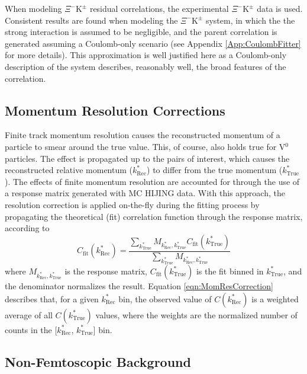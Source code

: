 \documentclass[ALICE,manyauthors]{cernphprep}
\newcommand{\ktrue}{$k^{*}_{\mathrm{True}}$\xspace}
\newcommand{\krec}{$k^{*}_{\mathrm{Rec}}$\xspace}
\newcommand{\XiKpm}{$\Xi^{-}\mathrm{K^{\pm}}$\xspace}
\newcommand{\Vz}{V$^{0}$\xspace}
\begin{document}
When modeling \XiKpm residual correlations, the experimental \XiKpm data is used. 
Consistent results are found when modeling the \XiKpm system, in which the the strong interaction is assumed to be negligible, and the parent correlation is generated assuming a Coulomb-only scenario (see Appendix \ref{App:CoulombFitter} for more details).
This approximation is well justified here as a Coulomb-only description of the system describes, reasonably well, the broad features of the correlation.   


\subsection{Momentum Resolution Corrections}
\label{MomentumResolutionCorrections}

Finite track momentum resolution causes the reconstructed momentum of a particle to smear around the true value.
This, of course, also holds true for \Vz particles.
The effect is propagated up to the pairs of interest, which causes the reconstructed relative momentum (\krec) to differ from the true momentum (\ktrue).
The effects of finite momentum resolution are accounted for through the use of a response matrix generated with MC HIJING data.
With this approach, the resolution correction is applied on-the-fly during the fitting process by propagating the theoretical (fit) correlation function through the response matrix, according to
\begin{equation}
  C_{\mathrm{fit}}(k^{*}_{\mathrm{Rec}}) = \dfrac{\sum\limits_{k^{*}_{\mathrm{True}}}M_{k^{*}_{\mathrm{Rec}},k^{*}_{\mathrm{True}}}C_{\mathrm{fit}}(k^{*}_{\mathrm{True}})}{\sum\limits_{k^{*}_{\mathrm{True}}}M_{k^{*}_{\mathrm{Rec}},k^{*}_{\mathrm{True}}}}
\label{eqn:MomResCorrection}
\end{equation}
where $M_{k^{*}_{\mathrm{Rec}},k^{*}_{\mathrm{True}}}$ is the response matrix, $C_{\mathrm{fit}}(k^{*}_{\mathrm{True}})$ is the fit binned in \ktrue, and the denominator normalizes the result.
Equation \ref{eqn:MomResCorrection} describes that, for a given \krec bin, the observed value of $C(k^{*}_{\mathrm{Rec}})$ is a weighted average of all $C(k^{*}_{\mathrm{True}})$ values, where the weights are the normalized number of counts in the [\krec, \ktrue] bin.



\subsection{Non-Femtoscopic Background}
\label{NonFlatBackground}
\end{document}
